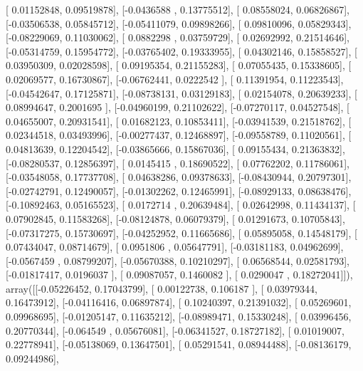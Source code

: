 \documentclass{article}
\begin{document}
       [ 0.01152848,  0.09519878],
       [-0.0436588 ,  0.13775512],
       [ 0.08558024,  0.06826867],
       [-0.03506538,  0.05845712],
       [-0.05411079,  0.09898266],
       [ 0.09810096,  0.05829343],
       [-0.08229069,  0.11030062],
       [ 0.0882298 ,  0.03759729],
       [ 0.02692992,  0.21514646],
       [-0.05314759,  0.15954772],
       [-0.03765402,  0.19333955],
       [ 0.04302146,  0.15858527],
       [ 0.03950309,  0.02028598],
       [ 0.09195354,  0.21155283],
       [ 0.07055435,  0.15338605],
       [ 0.02069577,  0.16730867],
       [-0.06762441,  0.0222542 ],
       [ 0.11391954,  0.11223543],
       [-0.04542647,  0.17125871],
       [-0.08738131,  0.03129183],
       [ 0.02154078,  0.20639233],
       [ 0.08994647,  0.2001695 ],
       [-0.04960199,  0.21102622],
       [-0.07270117,  0.04527548],
       [ 0.04655007,  0.20931541],
       [ 0.01682123,  0.10853411],
       [-0.03941539,  0.21518762],
       [ 0.02344518,  0.03493996],
       [-0.00277437,  0.12468897],
       [-0.09558789,  0.11020561],
       [ 0.04813639,  0.12204542],
       [-0.03865666,  0.15867036],
       [ 0.09155434,  0.21363832],
       [-0.08280537,  0.12856397],
       [ 0.0145415 ,  0.18690522],
       [ 0.07762202,  0.11786061],
       [-0.03548058,  0.17737708],
       [ 0.04638286,  0.09378633],
       [-0.08430944,  0.20797301],
       [-0.02742791,  0.12490057],
       [-0.01302262,  0.12465991],
       [-0.08929133,  0.08638476],
       [-0.10892463,  0.05165523],
       [ 0.0172714 ,  0.20639484],
       [ 0.02642998,  0.11434137],
       [ 0.07902845,  0.11583268],
       [-0.08124878,  0.06079379],
       [ 0.01291673,  0.10705843],
       [-0.07317275,  0.15730697],
       [-0.04252952,  0.11665686],
       [ 0.05895058,  0.14548179],
       [ 0.07434047,  0.08714679],
       [ 0.0951806 ,  0.05647791],
       [-0.03181183,  0.04962699],
       [-0.0567459 ,  0.08799207],
       [-0.05670388,  0.10210297],
       [ 0.06568544,  0.02581793],
       [-0.01817417,  0.0196037 ],
       [ 0.09087057,  0.1460082 ],
       [ 0.0290047 ,  0.18272041]]), array([[-0.05226452,  0.17043799],
       [ 0.00122738,  0.106187  ],
       [ 0.03979344,  0.16473912],
       [-0.04116416,  0.06897874],
       [ 0.10240397,  0.21391032],
       [ 0.05269601,  0.09968695],
       [-0.01205147,  0.11635212],
       [-0.08989471,  0.15330248],
       [ 0.03996456,  0.20770344],
       [-0.064549  ,  0.05676081],
       [-0.06341527,  0.18727182],
       [ 0.01019007,  0.22778941],
       [-0.05138069,  0.13647501],
       [ 0.05291541,  0.08944488],
       [-0.08136179,  0.09244986],
\end{document}
